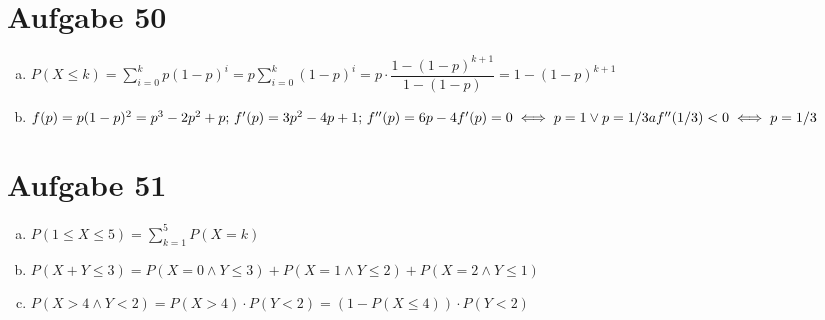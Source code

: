 \documentclass[10pt, oneside]{article}
\begin{document}
\section{Aufgabe 50}

\begin{enumerate}[(a)]
    \item $P(X \leq k) = \sum_{i = 0}^kp(1 - p)^i = p\sum_{i = 0}^k(1 - p)^i = p \cdot \dfrac{1 - (1 - p)^{k + 1}}{1 - (1 - p)} = 1 - (1 - p)^{k + 1}$
    \item $f(p) = p(1 - p)^2 = p^3 - 2p^2 + p\text{;  } f'(p) = 3p^2 - 4p + 1\text{;  } f''(p) = 6p - 4 \\[5pt]
            f'(p) = 0 \iff p = 1 \lor p = 1/3a \\[5pt]
            f''(1/3) < 0 \iff p = 1/3$
\end{enumerate}

\section{Aufgabe 51}

\begin{enumerate}[(a)]
    \item $P(1 \leq X \leq 5) = \sum_{k = 1}^5P(X = k)$
    \item $P(X + Y \leq 3) = P(X = 0 \land Y \leq 3) + P(X = 1 \land Y \leq 2) + P(X = 2 \land Y \leq 1)$
    \item $P(X > 4 \land Y < 2) = P(X > 4) \cdot P(Y < 2) = (1 - P(X \leq 4)) \cdot P(Y < 2)$
\end{enumerate}
\end{document}
